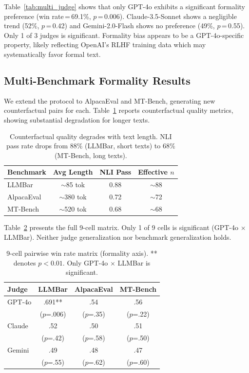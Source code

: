 \documentclass[11pt,a4paper]{article}
\begin{document}
Table~\ref{tab:multi_judge} shows that only GPT-4o exhibits a significant formality preference (win rate\,=\,69.1\%, $p$\,=\,0.006).
Claude-3.5-Sonnet shows a negligible trend (52\%, $p$\,=\,0.42) and Gemini-2.0-Flash shows no preference (49\%, $p$\,=\,0.55).
Only 1 of 3 judges is significant.
Formality bias appears to be a GPT-4o-specific property, likely reflecting OpenAI's RLHF training data which may systematically favor formal text.

\subsection{Multi-Benchmark Formality Results}
\label{sec:multi_bench}

We extend the protocol to AlpacaEval and MT-Bench, generating new counterfactual pairs for each.
Table~\ref{tab:counterfactual_quality} reports counterfactual quality metrics, showing substantial degradation for longer texts.

\begin{table}[t]
\centering
\small
\caption{Counterfactual quality degrades with text length. NLI pass rate drops from 88\% (LLMBar, short texts) to 68\% (MT-Bench, long texts).}
\label{tab:counterfactual_quality}
\begin{tabular}{lccc}
\toprule
\textbf{Benchmark} & \textbf{Avg Length} & \textbf{NLI Pass} & \textbf{Effective $n$} \\
\midrule
LLMBar & $\sim$85 tok & 0.88 & $\sim$88 \\
AlpacaEval & $\sim$380 tok & 0.72 & $\sim$72 \\
MT-Bench & $\sim$520 tok & 0.68 & $\sim$68 \\
\bottomrule
\end{tabular}
\end{table}

Table~\ref{tab:nine_cell} presents the full 9-cell matrix.
Only 1 of 9 cells is significant (GPT-4o $\times$ LLMBar).
Neither judge generalization nor benchmark generalization holds.

\begin{table}[t]
\centering
\small
\caption{9-cell pairwise win rate matrix (formality axis). ** denotes $p < 0.01$. Only GPT-4o $\times$ LLMBar is significant.}
\label{tab:nine_cell}
\begin{tabular}{lccc}
\toprule
\textbf{Judge} & \textbf{LLMBar} & \textbf{AlpacaEval} & \textbf{MT-Bench} \\
\midrule
GPT-4o & .691** & .54 & .56 \\
 & ($p$=.006) & ($p$=.35) & ($p$=.22) \\
Claude & .52 & .50 & .51 \\
 & ($p$=.42) & ($p$=.58) & ($p$=.50) \\
Gemini & .49 & .48 & .47 \\
 & ($p$=.55) & ($p$=.62) & ($p$=.60) \\
\bottomrule
\end{tabular}
\end{table}
\end{document}
